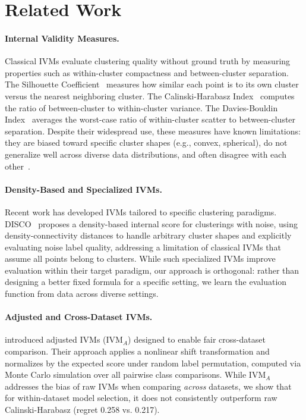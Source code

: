 \documentclass[10pt]{article} %
\begin{document}
\section{Related Work}
\label{sec:related}

\paragraph{Internal Validity Measures.}
Classical IVMs evaluate clustering quality without ground truth by measuring properties such as within-cluster compactness and between-cluster separation. The Silhouette Coefficient~\citep{rousseeuw1987silhouettes} measures how similar each point is to its own cluster versus the nearest neighboring cluster. The Calinski-Harabasz Index~\citep{calinski1974dendrite} computes the ratio of between-cluster to within-cluster variance. The Davies-Bouldin Index~\citep{davies1979cluster} averages the worst-case ratio of within-cluster scatter to between-cluster separation. Despite their widespread use, these measures have known limitations: they are biased toward specific cluster shapes (e.g., convex, spherical), do not generalize well across diverse data distributions, and often disagree with each other~\citep{arbelaitz2013extensive}.

\paragraph{Density-Based and Specialized IVMs.}
Recent work has developed IVMs tailored to specific clustering paradigms. DISCO~\citep{beer2026internal} proposes a density-based internal score for clusterings with noise, using density-connectivity distances to handle arbitrary cluster shapes and explicitly evaluating noise label quality, addressing a limitation of classical IVMs that assume all points belong to clusters. While such specialized IVMs improve evaluation within their target paradigm, our approach is orthogonal: rather than designing a better fixed formula for a specific setting, we learn the evaluation function from data across diverse settings.

\paragraph{Adjusted and Cross-Dataset IVMs.}
\citet{jeon2025measuring} introduced adjusted IVMs (IVM$_A$) designed to enable fair cross-dataset comparison. Their approach applies a nonlinear shift transformation and normalizes by the expected score under random label permutation, computed via Monte Carlo simulation over all pairwise class comparisons. While IVM$_A$ addresses the bias of raw IVMs when comparing \emph{across} datasets, we show that for within-dataset model selection, it does not consistently outperform raw Calinski-Harabasz (regret 0.258 vs. 0.217).
\end{document}
